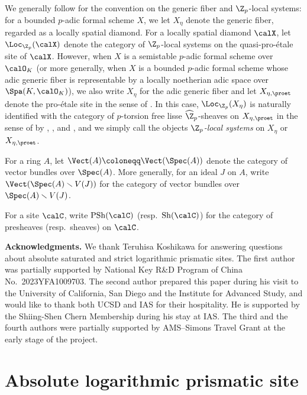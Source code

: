 We generally follow \cite[Notation~3.1]{bhatt-scholze-prismaticFcrystal} for the convention on the generic fiber and $\Z_p$-local systems: 
for a bounded $p$-adic formal scheme $X$, we let $X_\eta$ denote the generic fiber, regarded as a locally spatial diamond. For a locally spatial diamond $\calX$, let $\Loc_{\Z_p}(\calX)$ denote the category of $\Z_p$-local systems on the quasi-pro-\'etale site of $\calX$. However, when $X$ is a semistable $p$-adic formal scheme over $\calO_K$ (or more generally, when $X$ is a bounded $p$-adic formal scheme whose adic generic fiber is representable by a locally noetherian adic space over $\Spa(K,\calO_K)$), we also write $X_\eta$ for the adic generic fiber and let $X_{\eta,\proet}$ denote the pro-\'etale site in the sense of \cite{scholze-p-adic-hodge, Scholze-p-adicHodgeerrata}. In this case, $\Loc_{\Z_p}(X_\eta)$ is naturally identified with the category of $p$-torsion free lisse $\widehat{\Z}_p$-sheaves on $X_{\eta,\proet}$ in the sense of \cite[Def.~8.1]{scholze-p-adic-hodge} by \cite[Prop.~8.2]{scholze-p-adic-hodge}, \cite[Prop.~3.6, 3.7]{MannWerner-Localsystemsondiamonds}, and \cite[Lem.~15.6]{scholze-etalecohomologyofdiamonds}, and we simply call the objects \emph{$\Z_p$-local systems} on $X_\eta$ or $X_{\eta,\proet}$.

For a ring $A$, let $\Vect(A)\coloneqq \Vect(\Spec (A))$ denote the category of vector bundles over $\Spec(A)$. More generally, for an ideal $J$ on $A$, write $\Vect(\Spec(A)\smallsetminus V(J))$ for the category of vector bundles over $\Spec(A)\smallsetminus V(J)$.

For a site $\calC$, write $\operatorname{PSh}(\calC)$ (resp.~$\operatorname{Sh}(\calC)$) for the category of presheaves (resp.~sheaves) on $\calC$. 


\medskip
\noindent
\textbf{Acknowledgments.}
We thank Teruhisa Koshikawa for answering questions about absolute saturated and strict logarithmic prismatic sites. The first author was partially supported by National Key R\&D Program of China No.~2023YFA1009703. 
The second author prepared this paper during his visit to the University of California, San Diego and the Institute for Advanced Study, and would like to thank both UCSD and IAS for their hospitality. He is supported by the Shiing-Shen Chern Membership during his stay at IAS. 
The third and the fourth authors were partially supported by AMS--Simons Travel Grant at the early stage of the project.



\section{Absolute logarithmic prismatic site} \label{sec:absolute-log-prismatic-site}

